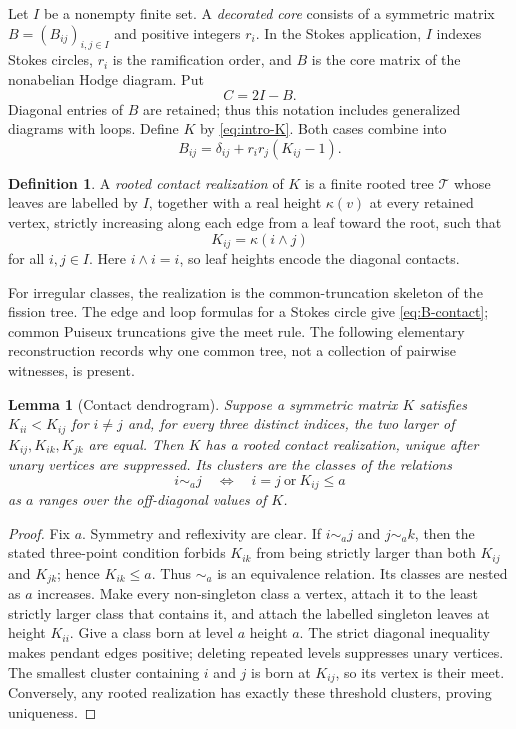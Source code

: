 \documentclass[11pt,a4paper]{amsart}
\theoremstyle{plain}
\newtheorem{lemma}[theorem]{Lemma}
\theoremstyle{definition}
\newtheorem{definition}[theorem]{Definition}
\newcommand{\Tcal}{\mathcal T}
\begin{document}
Let $I$ be a nonempty finite set.  A \emph{decorated core} consists of a symmetric matrix
$B=(B_{ij})_{i,j\in I}$ and positive integers $r_i$.  In the Stokes application, $I$ indexes
Stokes circles, $r_i$ is the ramification order, and $B$ is the core matrix of the nonabelian
Hodge diagram.  Put
\begin{equation}\label{eq:Cartan-def}
                         C=2I-B.
\end{equation}
Diagonal entries of $B$ are retained; thus this notation includes generalized diagrams with
loops.  Define $K$ by \eqref{eq:intro-K}.  Both cases combine into
\begin{equation}\label{eq:B-contact}
            B_{ij}=\delta_{ij}+r_ir_j(K_{ij}-1).
\end{equation}

\begin{definition}\label{def:rooted-realization}
A \emph{rooted contact realization} of $K$ is a finite rooted tree $\Tcal$ whose leaves are
labelled by $I$, together with a real height $\kappa(v)$ at every retained vertex, strictly
increasing along each edge from a leaf toward the root, such that
\[
                         K_{ij}=\kappa(i\wedge j)
\]
for all $i,j\in I$.  Here $i\wedge i=i$, so leaf heights encode the diagonal contacts.
\end{definition}

For irregular classes, the realization is the common-truncation skeleton of the fission tree.
The edge and loop formulas for a Stokes circle give \eqref{eq:B-contact}; common Puiseux
truncations give the meet rule.  The following elementary reconstruction records why one common
tree, not a collection of pairwise witnesses, is present.

\begin{lemma}[Contact dendrogram]\label{lem:dendrogram}
Suppose a symmetric matrix $K$ satisfies $K_{ii}<K_{ij}$ for $i\ne j$ and, for every three
distinct indices, the two larger of $K_{ij},K_{ik},K_{jk}$ are equal.  Then $K$ has a rooted
contact realization, unique after unary vertices are suppressed.  Its clusters are the classes of
the relations
\[
 i\sim_a j\quad\Longleftrightarrow\quad i=j\ \text{or}\ K_{ij}\le a
\]
as $a$ ranges over the off-diagonal values of $K$.
\end{lemma}

\begin{proof}
Fix $a$.  Symmetry and reflexivity are clear.  If $i\sim_a j$ and $j\sim_a k$, then the stated
three-point condition forbids $K_{ik}$ from being strictly larger than both $K_{ij}$ and $K_{jk}$;
hence $K_{ik}\le a$.  Thus $\sim_a$ is an equivalence relation.  Its classes are nested as $a$
increases.  Make every non-singleton class a vertex, attach it to the least strictly larger class
that contains it, and attach the labelled singleton leaves at height $K_{ii}$.  Give a class born
at level $a$ height $a$.  The strict diagonal inequality makes pendant edges positive; deleting
repeated levels suppresses unary vertices.  The smallest cluster containing $i$ and $j$ is born at
$K_{ij}$, so its vertex is their meet.  Conversely, any rooted realization has exactly these
threshold clusters, proving uniqueness.
\end{proof}
\end{document}
